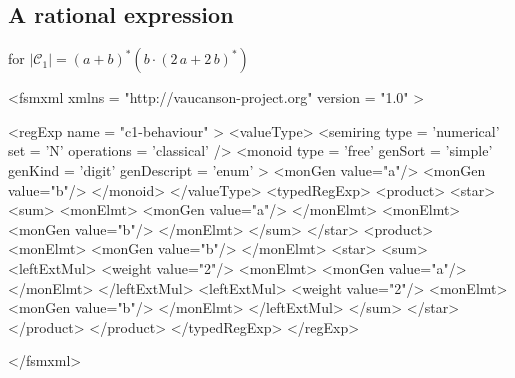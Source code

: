 \newpage

\subsection{A rational expression}
for $|\mathcal{C}_{1}| = (a+b)^{*}(b\cdot(2\,a + 2\,b)^{*})$
\label{regExpC1}

{\footnotesize
\begin{listing}[5]{1}
<fsmxml  xmlns   = "http://vaucanson-project.org"
         version = "1.0" >

<regExp name = "c1-behaviour" >
  <valueType>
    <semiring  type        = 'numerical'
               set         = 'N'
               operations  = 'classical' />
    <monoid    type        = 'free'
               genSort     = 'simple'
               genKind     = 'digit'
               genDescript = 'enum' >
      <monGen value="a"/>
      <monGen value="b"/>
    </monoid>
  </valueType>
  <typedRegExp>
    <product>
      <star>
        <sum>
          <monElmt>
            <monGen value="a"/>
          </monElmt>
          <monElmt>
            <monGen value="b"/>
          </monElmt>
        </sum>
      </star>
      <product>
        <monElmt>
          <monGen value="b"/>
        </monElmt>
        <star>
          <sum>
      <leftExtMul>
              <weight value="2"/>
        <monElmt>
    <monGen value="a"/>
        </monElmt>
      </leftExtMul>
      <leftExtMul>
              <weight value="2"/>
        <monElmt>
    <monGen value="b"/>
        </monElmt>
      </leftExtMul>
          </sum>
        </star>
      </product>
    </product>
  </typedRegExp>
</regExp>

</fsmxml>
\end{listing}
}

\clearpage
\newpage
